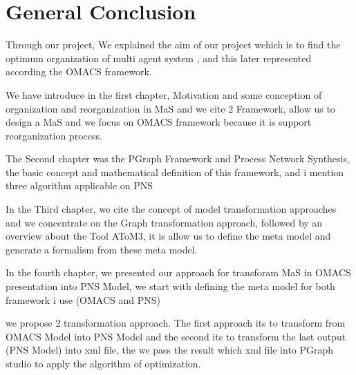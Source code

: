 
\chapter*{General Conclusion}


Through our project, We explained the aim of our project wchich is to find the optimum organization of multi agent system 
, and this later represented according the OMACS framework.

We have introduce in the first chapter, Motivation and some conception of organization and reorganization in MaS and we cite 2 Framework, 
allow us to design a MaS and we focus on OMACS framework because it is support reorganization process.

The Second chapter was the PGraph Framework and Process Network Synthesis, the basic concept and mathematical definition  of this framework, and i mention 
three algorithm applicable on PNS 

In the Third chapter, we cite the concept of model transformation approaches and we concentrate on the Graph transformation approach, followed by an overview about the Tool AToM3, it is allow us to define the meta model and generate a formalism from these meta model.

In the fourth chapter, we presented our approach for transforam MaS in OMACS presentation into PNS Model, we start with defining the meta model for both framework i use (OMACS and PNS)

we propose 2 transformation approach. The first approach its to transform from OMACS Model into PNS Model and the second its to transform the last output (PNS Model) into xml file, the we pass the result which xml file into PGraph studio to apply the algorithm of optimization. 
